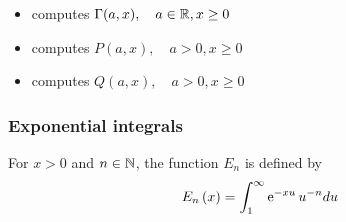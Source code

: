 \begin{itemize}
\item {}
  \sshortdescribe   computes $\Gamma(a, x), \quad a \in {\mathbb R} , x \geq 0$
\item {}
  \sshortdescribe  computes $P(a, x), \quad a > 0 , x \geq 0$
\item {}
  \sshortdescribe  computes $Q(a, x), \quad a > 0 , x \geq 0$
\end{itemize}

\subsubsection{Exponential integrals}
For $x>0$ and $n \in {\mathbb N}$, the  function $E_n$ is defined by
\begin{equation*}
  E_n\left( x \right)=\int_{1}^{\infty} \operatorname{e}^{ -x u } u^{-n} du
\end{equation*}

